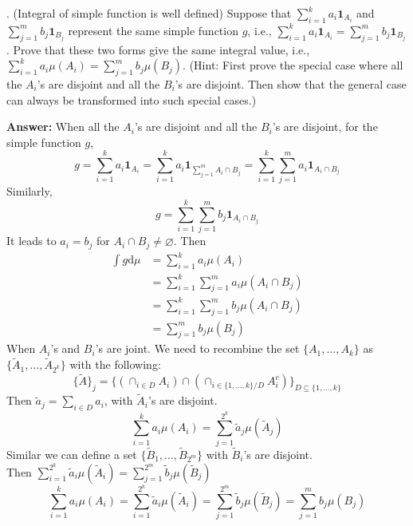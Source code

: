 \documentclass[onecolumn, 12pt]{IEEEtran}
\newcommand{\dd}{\mathrm{d}}
\begin{document}
. (Integral of simple function is well defined) Suppose that $\sum_{i=1}^{k}a_i\mathbf{1}_{A_i}$ and $\sum_{j=1}^{m}b_j\mathbf{1}_{B_j}$ represent the same simple function $g$, i.e., $\sum_{i=1}^{k}a_i\mathbf{1}_{A_i}=\sum_{j=1}^{m}b_j\mathbf{1}_{B_j}$. Prove that these two forms give the same
integral value, i.e., $\sum_{i=1}^{k}a_i\mu(A_i)=\sum_{j=1}^{m}b_j\mu(B_j)$. (Hint: First prove the special case where all the $A_i$’s are disjoint and all the $B_i$’s are disjoint. Then show that the general case can always be transformed into such special cases.)

\vspace*{0.3in}
\noindent
{\bf Answer:}
\noindent When all the $A_i$’s are disjoint and all the $B_i$’s are disjoint, for the simple function $g$,
\begin{equation}
g=\sum_{i=1}^{k}a_i\mathbf{1}_{A_i}=\sum_{i=1}^{k}a_i\mathbf{1}_{\sum_{j=1}^{m}A_i\cap B_j}=\sum_{i=1}^{k}\sum_{j=1}^{m}a_i\mathbf{1}_{A_i\cap B_j}
\end{equation}
Similarly,
\begin{equation}
g=\sum_{i=1}^{k}\sum_{j=1}^{m}b_j\mathbf{1}_{A_i\cap B_j}
\end{equation}
It leads to $a_i=b_j$ for $A_i\cap B_j \ne \varnothing$.
Then 
\begin{equation}
\begin{aligned}
\int g \dd \mu&=\sum_{i=1}^{k}a_i\mu(A_i)\\
&=\sum_{i=1}^{k}\sum_{j=1}^{m}a_i\mu(A_i\cap B_j)\\
&=\sum_{i=1}^{k}\sum_{j=1}^{m}b_j\mu(A_i\cap B_j)\\
&=\sum_{j=1}^{m}b_j\mu(B_j)
\end{aligned}
\end{equation}
When $A_i$’s and $B_i$’s are joint.
We need to recombine the set $\{A_1, \dots, A_k\}$ as $\{\tilde{A}_1, \dots, \tilde{A}_{2^k}\}$ with the following:
\begin{equation}
\{\tilde{A}\}_j=\{(\cap_{i\in D} A_i)\cap(\cap_{i\in \{1, \dots, k\}/D}A_i^{c})\}_{D\subseteq\{1, \dots, k\}}
\end{equation}
Then $\tilde{a}_j=\sum_{i\in D}a_i$, with $\tilde{A}_i$'s are disjoint.
\begin{equation}
\sum_{i=1}^{k}a_i\mu(A_i)=\sum_{j=1}^{2^k}\tilde{a}_j\mu(\tilde{A}_j)
\end{equation}
Similar we can define a set $\{\tilde{B}_1, \dots, \tilde{B}_{2^m}\}$ with $\tilde{B}_i$'s are disjoint.\\
Then $\sum_{i=1}^{2^k}\tilde{a}_i\mu(\tilde{A}_i)=\sum_{j=1}^{2^m}\tilde{b}_j\mu(\tilde{B}_j)$
\begin{equation}
\sum_{i=1}^{k}a_i\mu(A_i)=\sum_{i=1}^{2^k}\tilde{a}_i\mu(\tilde{A}_i)=\sum_{j=1}^{2^m}\tilde{b}_j\mu(\tilde{B}_j)=\sum_{j=1}^{m}b_j\mu(B_j)
\end{equation}
\vspace*{0.3in}
\end{document}
